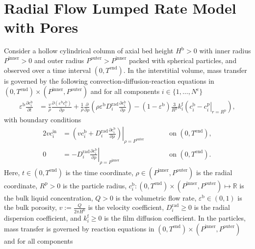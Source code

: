 \documentclass{article}
\begin{document}
\section*{Radial Flow Lumped Rate Model with Pores}
Consider a hollow cylindrical column of axial bed height $H^{\mathrm{b}} > 0$ with inner radius $P^{\mathrm{inner}} > 0$ and outer radius $P^{\mathrm{outer}} > P^{\mathrm{inner}}$ packed with spherical particles, and observed over a time interval $(0, T^{\mathrm{end}})$.
In the interstitial volume, mass transfer is governed by the following convection-diffusion-reaction equations in $(0, T^{\mathrm{end}})\times (P^{\mathrm{inner}}, P^{\mathrm{outer}})$ and for all components $i\in\{1, \dots, N^{\mathrm{c}} \}$
\begin{align}
    \varepsilon^{\mathrm{b}} \frac{\partial c^{\mathrm{b}}_{i}}{\partial t}
    &= \frac{v}{\rho} \frac{\partial \left( \varepsilon^{\mathrm{b}} c^{\mathrm{b}}_{i} \right)}{\partial \rho}
        + \frac{1}{\rho} \frac{\partial}{\partial \rho} \left( \rho \varepsilon^{\mathrm{b}} D^{\mathrm{rad}}_{i} \frac{\partial c^{\mathrm{b}}_{i}}{\partial \rho} \right)
        - \left(1 - \varepsilon^{\mathrm{b}} \right) \frac{3}{R^{\mathrm{p}}} k^{\mathrm{f}}_{i} \left(c^{\mathrm{b}}_{i} - \left. c^{\mathrm{p}}_{i} \right|_{r = R^{\mathrm{p}}} \right),
\end{align}
with boundary conditions
\begin{alignat}{2}
    v c^{\mathrm{in}}_{i}
    &= \left.\left( v c^{\mathrm{b}}_{i} + D^{\mathrm{rad}}_{i} \frac{\partial c^{\mathrm{b}}_{i}}{\partial \rho}\right)\right|_{\rho=P^{\mathrm{outer}}}
    & & \qquad\text{on }(0, T^{\mathrm{end}}),
    \\
    0
    &= - D^{\mathrm{rad}}_{i} \left. \frac{\partial c^{\mathrm{b}}_{i}}{\partial \rho} \right|_{\rho=P^{\mathrm{inner}}}
    & & \qquad\text{on }(0, T^{\mathrm{end}}).
\end{alignat}
Here, $t\in (0, T^{\mathrm{end}})$ is the time coordinate, $\rho\in (P^{\mathrm{inner}}, P^{\mathrm{outer}})$ is the radial coordinate, $R^{\mathrm{p}}> 0$ is the particle radius, $c^{\mathrm{b}}_{i}\colon (0, T^{\mathrm{end}})\times (P^{\mathrm{inner}}, P^{\mathrm{outer}}) \mapsto \mathbb{R}$ is the bulk liquid concentration, $Q> 0$ is the volumetric flow rate, $\varepsilon^{\mathrm{b}}\in (0, 1)$ is the bulk porosity, $v:= \frac{Q}{2 \pi H^{\mathrm{b}}}$ is the velocity coefficient, $D^{\mathrm{rad}}_{i}\geq 0$ is the radial dispersion coefficient, and $k^{\mathrm{f}}_{i}\geq 0$ is the film diffusion coefficient.
In the particles, mass transfer is governed by reaction equations in $(0, T^{\mathrm{end}}) \times (P^{\mathrm{inner}}, P^{\mathrm{outer}})$ and for all components
\end{document}
